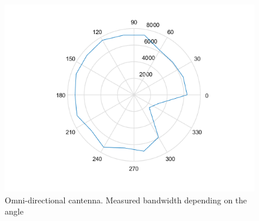 \documentclass[12pt,a4paper]{article}
\newcommand{\figurewidth}[0]{.65\textwidth}
\begin{document}
\begin{figure}
\begin{center}
	\includegraphics[width=\figurewidth]{plots/polar_omni_b.png}
	\caption{Omni-directional cantenna. Measured bandwidth depending on the angle}
	\label{img:ang:band:omni}
\end{center}\end{figure}


\end{document}
